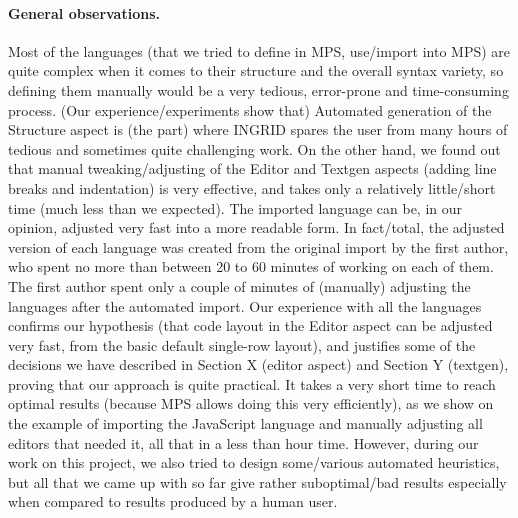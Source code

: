 \paragraph{General observations.}
Most of the languages (that we tried to define in MPS, use/import into MPS) are quite complex when it comes to their structure and the overall syntax variety, so defining them manually would be a very tedious, error-prone and time-consuming process.
(Our experience/experiments show that) Automated generation of the Structure aspect is (the part) where INGRID spares the user from many hours of tedious and sometimes quite challenging work.
On the other hand, we found out that manual tweaking/adjusting of the Editor and Textgen aspects (adding line breaks and indentation) is very effective, and takes only a relatively little/short time (much less than we expected).
The imported language can be, in our opinion, adjusted very fast into a more readable form.
In fact/total, the adjusted version of each language was created from the original import by the first author, who spent no more than between 20 to 60 minutes of working on each of them.
The first author spent only a couple of minutes of (manually) adjusting the languages after the automated import.
Our experience with all the languages confirms our hypothesis (that code layout in the Editor aspect can be adjusted very fast, from the basic default single-row layout), and justifies some of the decisions we have described in Section X (editor aspect) and Section Y (textgen), proving that our approach is quite practical.
It takes a very short time to reach optimal results (because MPS allows doing this very efficiently), as we show on the example of importing the JavaScript language and manually adjusting all editors that needed it, all that in a less than hour time.
 However, during our work on this project, we also tried to design some/various automated heuristics, but all that we came up with so far give rather suboptimal/bad results especially when compared to results produced by a human user.


